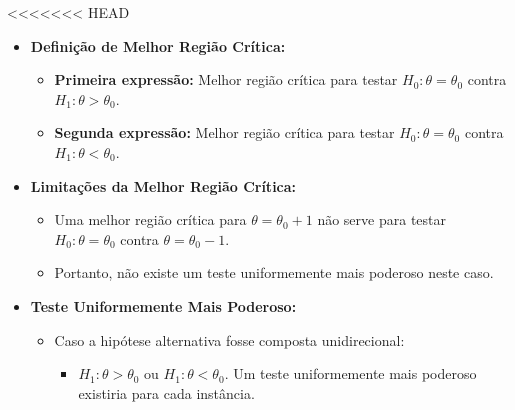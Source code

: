 \documentclass[12pt]{beamer}
\begin{document}
\begin{frame}{}
\begin{block}{}
\justifying
<<<<<<< HEAD
%
\begin{itemize}
	\item \textbf{Definição de Melhor Região Crítica:}
	\begin{itemize}
		\item \textbf{Primeira expressão:} Melhor região crítica para testar $H_0 : \theta = \theta_0$ contra $H_1 : \theta > \theta_0$.\pause
		\item \textbf{Segunda expressão:} Melhor região crítica para testar $H_0 : \theta = \theta_0$ contra $H_1 : \theta < \theta_0$.
	\end{itemize}
	\pause
	\item \textbf{Limitações da Melhor Região Crítica:}
	\begin{itemize}
		\item Uma melhor região crítica para $\theta = \theta_0 + 1$ não serve para testar $H_0 : \theta = \theta_0$ contra $\theta = \theta_0 - 1$.\pause
		\item Portanto, não existe um teste uniformemente mais poderoso neste caso.
	\end{itemize}
	\pause
	\item \textbf{Teste Uniformemente Mais Poderoso:}
	\begin{itemize}
		\item Caso a hipótese alternativa fosse composta unidirecional:
		\begin{itemize}
			\item $H_1 : \theta > \theta_0$ ou $H_1 : \theta < \theta_0$. Um teste uniformemente mais poderoso existiria para cada instância.
		\end{itemize}
	\end{itemize}
\end{itemize}


\end{block}
\end{frame}
\end{document}
